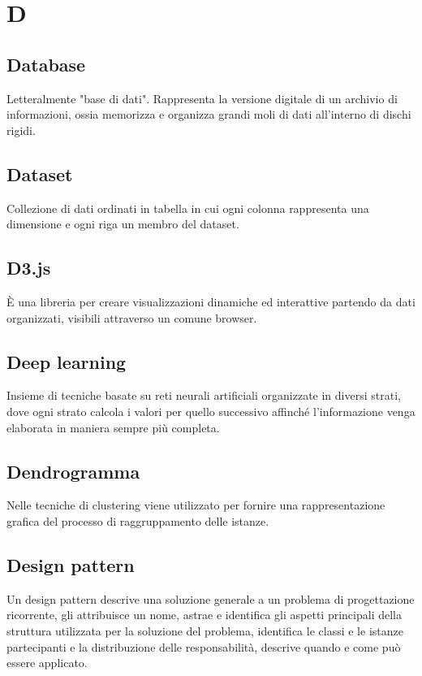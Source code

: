 \section*{D}
\markright{}

\subsection*{Database}
Letteralmente "base di dati". Rappresenta la versione digitale di un archivio di informazioni, ossia memorizza e organizza grandi moli di dati all'interno di dischi rigidi.

\subsection*{Dataset}
Collezione di dati ordinati in tabella in cui ogni colonna rappresenta una dimensione e ogni riga un membro del dataset.

\subsection*{D3.js}
È una libreria  per creare visualizzazioni dinamiche ed interattive partendo da dati organizzati, visibili attraverso un comune browser.

\subsection*{Deep learning}
Insieme di tecniche basate su reti neurali artificiali organizzate in diversi strati, dove ogni strato calcola i valori per quello successivo affinché l'informazione venga elaborata in maniera sempre più completa.

\subsection*{Dendrogramma}
Nelle tecniche di clustering viene utilizzato per fornire una rappresentazione grafica del processo di raggruppamento delle istanze.

\subsection*{Design pattern}
Un design pattern descrive una soluzione generale a un problema di progettazione ricorrente, gli attribuisce un nome, astrae e identifica gli aspetti principali della struttura utilizzata per la soluzione del problema, identifica le classi e le istanze partecipanti e la distribuzione delle responsabilità, descrive quando e come può essere applicato. 

